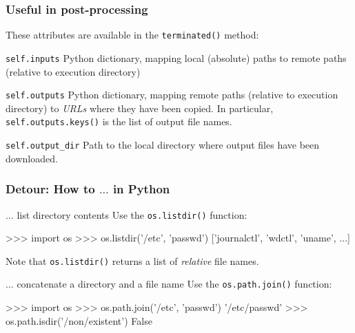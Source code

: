 \documentclass[english,serif,mathserif,xcolor=pdftex,dvipsnames,table]{beamer}
\begin{document}
\begin{frame}[fragile]
  \frametitle{Useful in post-processing}\small

  These attributes are available in the \texttt{terminated()} method:

  \+
  \begin{describe}{\lstinline|self.inputs|}
    Python dictionary, mapping local (absolute) paths to remote paths (relative
    to execution directory)
  \end{describe}

  \+
  \begin{describe}{\lstinline|self.outputs|}
    Python dictionary, mapping remote paths (relative to execution directory) to
    \emph{URLs} where they have been copied. In particular,
    \lstinline|self.outputs.keys()| is the list of output file names.
  \end{describe}

  \+
  \begin{describe}{\lstinline|self.output_dir|}
    Path to the local directory where output files have been downloaded.
  \end{describe}
\end{frame}


\begin{frame}[fragile]
  \frametitle{Detour: How to $\ldots$ in Python}
  \small{}

  \begin{describe}{$\ldots$ list directory contents}
    Use the \lstinline|os.listdir()| function:
    \begin{python}
>>> import os
>>> os.listdir('/etc', 'passwd')
['journalctl', 'wdctl', 'uname', ...]
\end{python}
  Note that \lstinline|os.listdir()| returns a list of \emph{relative} file names.
  \end{describe}

  \begin{describe}{$\ldots$ concatenate a directory and a file name}
    Use the \lstinline|os.path.join()| function:
    \begin{python}
>>> import os
>>> os.path.join('/etc', 'passwd')
'/etc/passwd'
>>> os.path.isdir('/non/existent')
False
    \end{python}
  \end{describe}
\end{frame}
\end{document}
